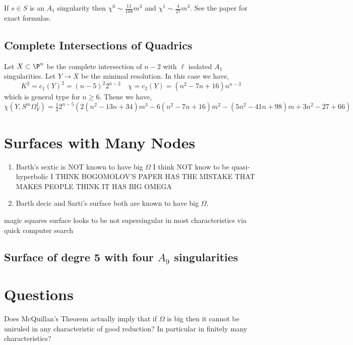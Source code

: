 \documentclass[12pt]{article}
\begin{document}
\begin{theorem}
If $s \in S$ is an $A_1$ singularity then $\chi^0 \sim \frac{11}{108} m^3$ and $\chi^1 \sim \frac{4}{27} m^3$. See the paper for exact formulas. 
\end{theorem}


\subsection{Complete Intersections of Quadrics}

Let $X \subset \P^n$ be the complete intersection of $n - 2$ with $\ell$ isolated $A_1$ singularities. Let $Y \to X$ be the minimal resolution. In this case we have,
\[ K^2 = c_1(Y)^2 = (n - 5)^2 2^{n-2} \quad \chi = c_2(Y) = (n^2 - 7n + 16)n^{n-3} \]
which is general type for $n \ge 6$.  Thene we have,
\[ \chi(Y, S^m \Omega_Y^1) = \tfrac{1}{3} 2^{n-5} (2 (n^2 - 13 n + 34) m^3 - 6(n^2 - 7n + 16) m^2 - (5 n^2 - 41 n + 98) m + 3 n^2 - 27 + 66) \]


\section{Surfaces with Many Nodes}

\begin{enumerate}
\item Barth's sextic is NOT known to have big $\Omega$ I think NOT know to be quasi-hyperbolic {\color{red} I THINK BOGOMOLOV'S PAPER HAS THE MISTAKE THAT MAKES PEOPLE THINK IT HAS BIG OMEGA}

\item Barth decic and Sarti's surface both are known to have big $\Omega$.
\end{enumerate}


{\color{red} magic squares surface looks to be not supersingular in most characteristics via quick computer search}



\subsection{Surface of degre 5 with four $A_9$ singularities}


\section{Questions}

Does McQuillan's Theorem actually imply that if $\Omega$ is big then it cannot be uniruled in any characteristic of good reduction? In particular in finitely many characteristics? 
\end{document}
